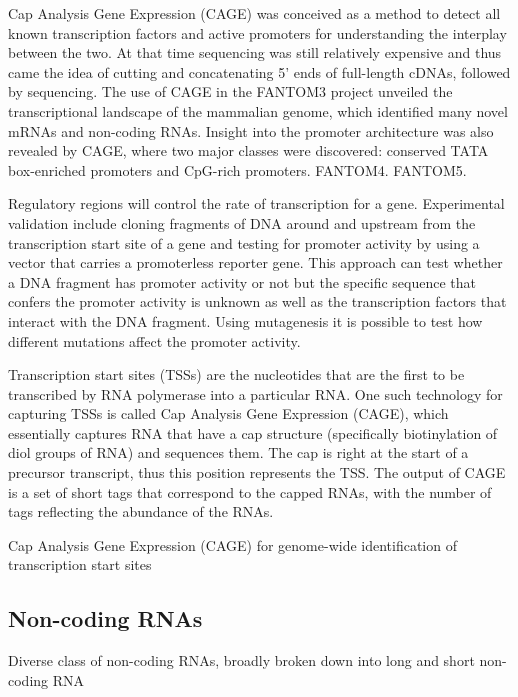 Cap Analysis Gene Expression (CAGE) was conceived as a method to detect all known transcription factors and active promoters for understanding the interplay between the two\cite{carninci2010capanalysis}. At that time sequencing was still relatively expensive and thus came the idea of cutting and concatenating 5' ends of full-length cDNAs, followed by sequencing. The use of CAGE in the FANTOM3 project unveiled the transcriptional landscape of the mammalian genome\cite{pmid16141072}, which identified many novel mRNAs and non-coding RNAs. Insight into the promoter architecture was also revealed by CAGE, where two major classes were discovered: conserved TATA box-enriched promoters and CpG-rich promoters\cite{pmid16645617}. FANTOM4\cite{pmid19377474}. FANTOM5\cite{pmid24670764}.

Regulatory regions will control the rate of transcription for a gene. Experimental validation include cloning fragments of DNA around and upstream from the transcription start site of a gene and testing for promoter activity by using a vector that carries a promoterless reporter gene. This approach can test whether a DNA fragment has promoter activity or not but the specific sequence that confers the promoter activity is unknown as well as the transcription factors that interact with the DNA fragment. Using mutagenesis it is possible to test how different mutations affect the promoter activity.

Transcription start sites (TSSs) are the nucleotides that are the first to be transcribed by RNA polymerase into a particular RNA. One such technology for capturing TSSs is called Cap Analysis Gene Expression (CAGE), which essentially captures RNA that have a cap structure (specifically biotinylation of diol groups of RNA\cite{pmid8938445}) and sequences them. The cap is right at the start of a precursor transcript, thus this position represents the TSS. The output of CAGE is a set of short tags that correspond to the capped RNAs, with the number of tags reflecting the abundance of the RNAs.

Cap Analysis Gene Expression (CAGE) for genome-wide identification of transcription start sites

\subsection{Non-coding RNAs}

Diverse class of non-coding RNAs, broadly broken down into long and short non-coding RNA

